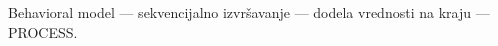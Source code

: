 \begin{frame}[label=07-s030]
Behavioral model — sekvencijalno izvršavanje — dodela vrednosti na kraju — \alert{PROCESS}.
\par\vspace{5mm}
\begin{center}\begin{minipage}{.85\textwidth}

\end{minipage}\end{center}
\end{frame}
